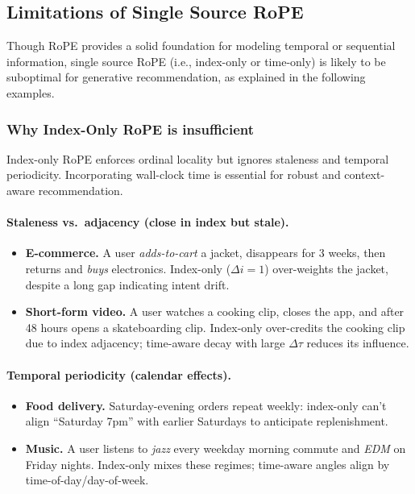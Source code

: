 \documentclass[sigconf]{acmart}
\begin{document}
\subsection{Limitations of Single Source RoPE}


Though RoPE provides a solid foundation for modeling temporal or sequential information, single source RoPE (i.e., index-only or time-only) is likely to be suboptimal for generative recommendation, as explained in the following examples.

\subsubsection*{Why Index-Only RoPE is insufficient}
Index-only RoPE enforces ordinal locality but ignores staleness and temporal periodicity. Incorporating wall-clock time is essential for robust and context-aware recommendation.




\paragraph{Staleness vs.\ adjacency (close in index but stale).}
\begin{itemize}
\item \textbf{E-commerce.} A user \emph{adds-to-cart} a jacket, disappears for 3 weeks, then returns and \emph{buys} electronics. Index-only ($\Delta i{=}1$) over-weights the jacket, despite a long gap indicating intent drift.
\item \textbf{Short-form video.} A user watches a cooking clip, closes the app, and after 48 hours opens a skateboarding clip. Index-only over-credits the cooking clip due to index adjacency; time-aware decay with large $\Delta\tau$ reduces its influence.
\end{itemize}

\paragraph{Temporal periodicity (calendar effects).}
\begin{itemize}
\item \textbf{Food delivery.} Saturday-evening orders repeat weekly: index-only can’t align “Saturday 7pm” with earlier Saturdays to anticipate replenishment.
\item \textbf{Music.} A user listens to \emph{jazz} every weekday morning commute and \emph{EDM} on Friday nights. Index-only mixes these regimes; time-aware angles align by time-of-day/day-of-week.
\end{itemize}
\end{document}
